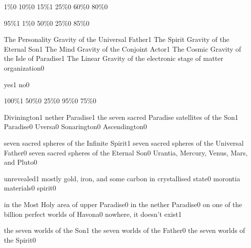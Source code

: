 {1\%}{0}
{10\%}{0}
{15\%}{1}
{25\%}{0}
{60\%}{0}
{80\%}{0}
\qstop

{95\%}{1}
{1\%}{0}
{50\%}{0}
{25\%}{0}
{85\%}{0}
\qstop

{The Personality Gravity of the Universal Father}{1}
{The Spirit Gravity of the Eternal Son}{1}
{The Mind Gravity of the Conjoint Actor}{1}
{The Cosmic Gravity of the Isle of Paradise}{1}
{The Linear Gravity of the electronic stage of matter organization}{0}
\qstop

{yes}{1}
{no}{0}
\qstop

{100\%}{1}
{50\%}{0}
{25\%}{0}
{95\%}{0}
{75\%}{0}
\qstop


{Divinington}{1}
{nether Paradise}{1}
{the seven sacred Paradise satellites of the Son}{1}
{Paradise}{0}
{Uversa}{0}
{Sonarington}{0}
{Ascendington}{0}
\qstop

{seven sacred spheres of the Infinite Spirit}{1}
{seven sacred spheres of the Universal Father}{0}
{seven sacred spheres of the Eternal Son}{0}
{Urantia, Mercury, Venus, Mars, and Pluto}{0}
\qstop

{unrevealed}{1}
{mostly gold, iron, and some carbon in crystallised state}{0}
{morontia materials}{0}
{spirit}{0}
\qstop

{in the Most Holy area of upper Paradise}{0}
{in the nether Paradise}{0}
{on one of the billion perfect worlds of Havona}{0}
{nowhere, it doesn't exist}{1}
\qstop

{the seven worlds of the Son}{1}
{the seven worlds of the Father}{0}
{the seven worlds of the Spirit}{0}
\qstop


